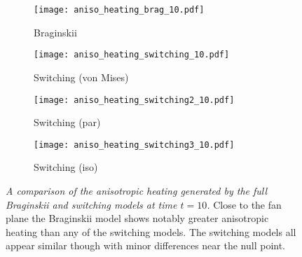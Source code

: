 \begin{figure}[t]
    \hfill
    \begin{subfigure}{0.49\textwidth}
      \texttt{[image: aniso\_heating\_brag\_10.pdf]}
      \caption{Braginskii}%
      \label{fig:aniso_heating_brag_10}
    \end{subfigure}
    \hfill
    \begin{subfigure}{0.49\textwidth}
      \texttt{[image: aniso\_heating\_switching\_10.pdf]}
      \caption{Switching (von Mises)}%
      \label{fig:aniso_heating_switching_10}
    \end{subfigure}
    \hfill
    \begin{subfigure}{0.49\textwidth}
      \texttt{[image: aniso\_heating\_switching2\_10.pdf]}
      \caption{Switching (par)}%
      \label{fig:aniso_heating_switching2_10}
    \end{subfigure}
    \hfill
    \begin{subfigure}{0.49\textwidth}
      \texttt{[image: aniso\_heating\_switching3\_10.pdf]}
      \caption{Switching (iso)}%
      \label{fig:aniso_heating_switching3_10}
    \end{subfigure}
    \caption{\emph{A comparison of the anisotropic heating generated by the full Braginskii and switching models at time $t=10$.} Close to the fan plane the Braginskii model shows notably greater anisotropic heating than any of the switching models. The switching models all appear similar though with minor differences near the null point.}
\label{fig:anisotropic_heating}%
\end{figure}

